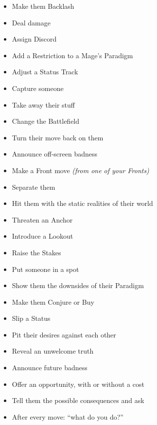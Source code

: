 \documentclass[letterpaper,10pt]{article}
\newcommand{\SECTION}[1]{\vspace{.5em}{\noindent\titlefont\LARGE\textbf{#1}}

}
\begin{document}
\SECTION{Your Moves}
\begin{itemize}
\item Make them Backlash
\item Deal damage
\item Assign Discord
\item Add a Restriction to a Mage’s Paradigm
\item Adjust a Status Track
\item Capture someone
\item Take away their stuff
\item Change the Battlefield
\bigskip
\item Turn their move back on them
\item Announce off-screen badness
\item Make a Front move \textit{(from one of your Fronts)}
\item Separate them
\item Hit them with the static realities of their world
\bigskip
\item Threaten an Anchor
\item Introduce a Lookout
\item Raise the Stakes
\item Put someone in a spot
\item Show them the downsides of their Paradigm
\item Make them Conjure or Buy
\item Slip a Status
\item Pit their desires against each other
\item Reveal an unwelcome truth
\item Announce future badness
\item Offer an opportunity, with or without a cost
\item Tell them the possible consequences and ask
\item After every move: ``what do you do?''
\end{itemize}
\end{document}
